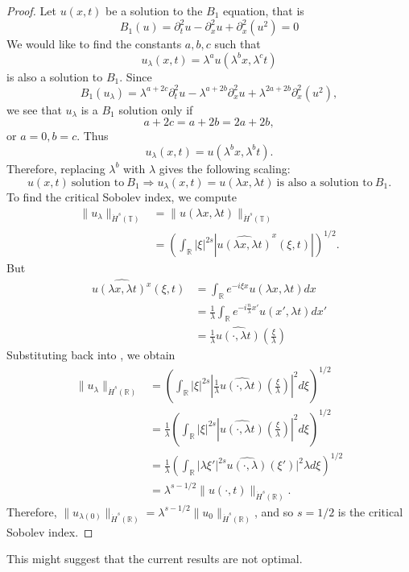 \documentclass[12pt,reqno]{amsart}
\numberwithin{equation}{section}  %
\renewcommand{\cref}{\Cref}
\newcommand{\rr}{\mathbb{R}}
\newcommand{\ci}{\mathbb{T}}
\newcommand{\wh}{\widehat}
\begin{document}
\begin{proof}
Let $u(x, t)$ be a solution to the $B_1$ equation, that is
$$
B_1(u)=
\partial_t^2u - \partial^2_x u + \partial_x^2(u^2)  = 0
$$
We would like to find the constants
$a, b, c$ such that
\[
u_\lambda (x, t) = \lambda^a u(\lambda^b x, \lambda^c t)
\]
is also a solution to $B_1$.  Since 
$$
B_1(u_\lambda)=
\lambda^{a+2c} \partial_t^2u 
-
\lambda^{a+2b} \partial^2_x u 
+
\lambda^{2a+2b}
\partial_x^2(u^2),  
$$
we see that $u_\lambda$ is a $B_1$ solution only if
$$
a+2c=a+2b=2a+2b,
$$
or
$
a=0, b=c.
$
Thus
\[
u_\lambda (x, t) = u(\lambda^{b}x,  \lambda^{b} t).
\]
Therefore, replacing  $ \lambda^b$ with  $ \lambda$ gives the following scaling:
\begin{equation}
\label{B2-scal}
\boxed{u(x, t) \ \text{solution to} \  B_1
\Longrightarrow 
u_\lambda (x, t) = u(\lambda x, \lambda t) \ \text{is also a
solution to} \  B_1. 
}
\end{equation}
\label{rem:scaling-B2}
To find the critical Sobolev index, we compute
\begin{equation}
\begin{split}
\| u_{\lambda} \|_{\dot{H}^s(\ci)} 
& =  \| u(\lambda x, \lambda t) \|_{\dot{H}^{s}(\ci)}
\\
& = \left( \int_{\rr} | \xi |^{2s} | \wh{u(\lambda x,
\lambda t)}^x (\xi, t)| \right)^{1/2}.
\end{split}
\label{crit-ind-comp-B2}
\end{equation}
But
\begin{equation*}
\begin{split}
\wh{u(\lambda x, \lambda t)^x}(\xi, t)
& = \int_{\rr}e^{-i\xi x}u(\lambda x, \lambda t) dx
\\
& = \frac{1}{\lambda} \int_{\rr}e^{-i \frac{n}{\lambda} x'}u(x',
\lambda t) dx'
\\
& = \frac{1}{\lambda} \wh{u(\cdot, \lambda t)}(\frac{\xi}{\lambda})
\end{split}
\end{equation*}
Substituting back into \cref{crit-ind-comp-B2}, we obtain
\begin{equation*}
\begin{split}
\| u_{\lambda} \|_{\dot{H}^s(\rr)} 
& = \left( \int_{\rr} | \xi |^{2s} |
\frac{1}{\lambda}\wh{u(\cdot, \lambda t)}(\frac{\xi}{\lambda}) |^2 d \xi
\right)^{1/2}
\\
& = \frac{1}{\lambda} \left( \int_{\rr}| \xi |^{2s} | \wh{u(\cdot,
\lambda t)}(\frac{\xi}{\lambda}) |^2 d \xi  \right)^{1/2}
\\
& = \frac{1}{\lambda} \left( \int_{\rr} | \lambda \xi' |^{2s} 
\wh{u(\cdot, \lambda)}(\xi') |^2 \lambda d \xi
\right)^{1/2}
\\
& = \lambda^{s - 1/2} \|u(\cdot, t) \|_{\dot{H}^s (\rr)}.
\end{split}
\end{equation*}
Therefore, $\| u_{\lambda(0)} \|_{\dot{H}^s(\rr)} = \lambda^{s - 1/2} \|
u_{0} \|_{\dot{H}^{s}(\rr)}$, and so $s=1/2$ is the critical Sobolev index.
\end{proof}
This might suggest that the current results are not optimal.

\end{document}
